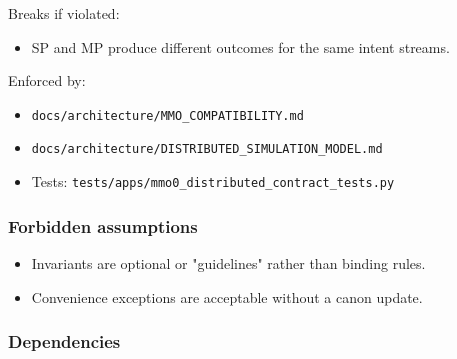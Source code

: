 \documentclass[9pt,a4paper,openany]{book}
\begin{document}
Breaks if violated:



\begin{itemize}
\item SP and MP produce different outcomes for the same intent streams.\allowbreak{}
\end{itemize}


Enforced by:



\begin{itemize}
\item \texttt{docs/\allowbreak{}architecture/\allowbreak{}MMO\_\allowbreak{}COMPATIBILITY.\allowbreak{}md}
\end{itemize}


\begin{itemize}
\item \texttt{docs/\allowbreak{}architecture/\allowbreak{}DISTRIBUTED\_\allowbreak{}SIMULATION\_\allowbreak{}MODEL.\allowbreak{}md}
\end{itemize}


\begin{itemize}
\item Tests: \texttt{tests/\allowbreak{}apps/\allowbreak{}mmo0\_\allowbreak{}distributed\_\allowbreak{}contract\_\allowbreak{}tests.\allowbreak{}py}
\end{itemize}





\subsubsection{Forbidden assumptions}


\begin{itemize}
\item Invariants are optional or "guidelines" rather than binding rules.\allowbreak{}
\end{itemize}


\begin{itemize}
\item Convenience exceptions are acceptable without a canon update.\allowbreak{}
\end{itemize}





\subsubsection{Dependencies}
\end{document}
